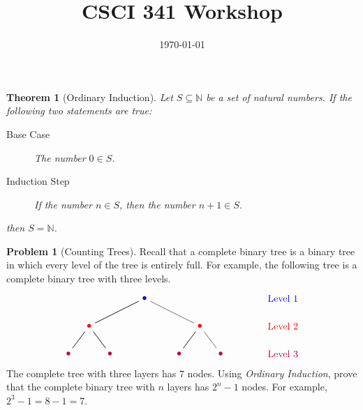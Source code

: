 \documentclass[11pt]{article}
\title{CSCI 341 Workshop \wshop}
\author{\subtitle}
\date{
    \today
}
\theoremstyle{theorem} %
\newtheorem{theorem}                    {{\color{Purple}Theorem}}[section]
\theoremstyle{definition} %
\newtheorem{problem}                    {{\color{BurntOrange}Problem}}
\theoremstyle{remark} %
\begin{document}
\maketitle


\begin{theorem}
    [Ordinary Induction]
    Let \(S \subseteq \mathbb{N}\) be a set of natural numbers.
    If the following two statements are true:
    \begin{description}
        \item[Base Case] The number \(0 \in S\).
        \item[Induction Step] If the number \(n \in S\), then the number \(n + 1 \in S\).
    \end{description}
    then \(S = \mathbb{N}\).
\end{theorem}

\begin{problem}
    [Counting Trees]
    Recall that a complete binary tree is a binary tree in which every level of the tree is entirely full. 
    For example, the following tree is a complete binary tree with three levels.
    \[\begin{tikzpicture}
        \node[blue] (level1) at (5, 0) {Level 1};
        \node[blue] (root) at (0,0) {\(\bullet\)};

        \node[red] (level1) at (5, -1) {Level 2};
        \node[red] (0) at (-2,-1) {\(\bullet\)};
        \node[red] (1) at (2,-1) {\(\bullet\)};

        \node[purple] (level1) at (5, -2) {Level 3};
        \node[purple] (00) at (-2.75,-2) {\(\bullet\)};
        \node[purple] (01) at (-1.25,-2) {\(\bullet\)};
        \node[purple] (10) at (1.25,-2) {\(\bullet\)};
        \node[purple] (11) at (2.75,-2) {\(\bullet\)};

        \draw (root) 
            -- (0) 
            -- (00) 
            -- (0) 
            -- (01) 
            -- (0) 
            -- (root) 
            -- (1)
            -- (10)
            -- (1)
            -- (11);
    \end{tikzpicture}\]
    The complete tree with three layers has \(7\) nodes. 
    Using \emph{Ordinary Induction}, prove that the complete binary tree with \(n\) layers has \(2^n - 1\) nodes.
    For example, \(2^3 - 1 = 8 - 1 = 7\).
\end{problem}
\end{document}
